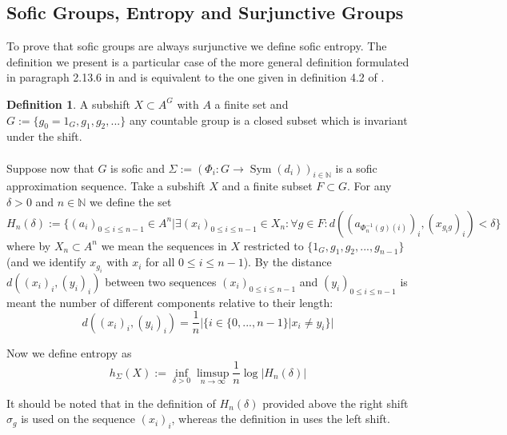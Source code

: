 \documentclass[titlepage, a4paper]{article}
\newcommand{\N}{\mathbb{N}}
\DeclareMathOperator{\sym}{Sym}
\theoremstyle{theoremdd}
\theoremstyle{definition}
\newtheorem{definition}[theorem]{Definition}
\theoremstyle{remark}
\begin{document}
\subsection{Sofic Groups, Entropy and Surjunctive Groups}\label{ssec:sofic_surjunctive}

To prove that sofic groups are always surjunctive we define sofic entropy. The definition we present is a particular case of the more general definition formulated in paragraph 2.13.6 in \cite{capraro_lupini_2015} and is equivalent to the one given in definition 4.2 of \cite{kerr_li_2010}. 

\begin{definition}

A subshift $X \subset A^G$ with $A$ a finite set and $G := \{g_0 = 1_G, g_1, g_2, ...\}$ any countable group is a closed subset which is invariant under the shift.\\
\\
Suppose now that $G$ is sofic and $\Sigma := (\Phi_i: G \to \sym(d_i))_{i \in \N}$ is a sofic approximation sequence. Take a subshift $X$ and a finite subset $F \subset G$. For any $\delta > 0$ and $n \in \N$ we define the set 
		\[
		H_n (\delta) := \{(a_i)_{0 \leq i \leq n-1} \in A^n | 
						\exists (x_i)_{0 \leq i \leq n-1} \in X_n : 
						\forall g \in F: d((a_{\Phi^{-1}_n(g)(i)})_i,(x_{ g_i g})_i) < \delta \}
		\]
		where by $X_n \subset A^n$ we mean the sequences in $X$ restricted to $\{1_G, g_1, g_2, ..., g_{n-1}\}$ (and we identify $x_{g_i}$ with $x_i$ for all $0 \leq i \leq n-1$). By the distance $d((x_i)_i, (y_i)_i)$ between two sequences $(x_i)_{0 \leq i \leq n-1}$ and $(y_i)_{0 \leq i \leq n-1}$ is meant the number of different components relative to their length:
		\[
		d((x_i)_i, (y_i)_i) = \frac{1}{n} |\{i \in \{0, ..., n-1\}|x_i \neq y_i\}|
		\]
				

		Now we define entropy as 
		\[
		h_\Sigma(X) := \inf_{\delta>0} \limsup_{n \to \infty} \frac{1}{n} \log |H_n(\delta)|
		\]
\end{definition}

It should be noted that in the definition of $H_n(\delta)$ provided above the right shift $\sigma_g$ is used on the sequence $(x_i)_i$, whereas the definition in \cite[paragraph 2.13.6]{capraro_lupini_2015} uses the left shift.\\
\end{document}
